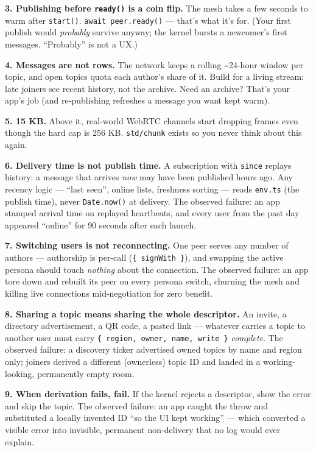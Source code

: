 \documentclass[
  nobib]{tufte-handout}
\begin{document}
\textbf{3. Publishing before \texttt{ready()} is a coin flip.} The mesh
takes a few seconds to warm after \texttt{start()}.
\texttt{await\ peer.ready()} --- that's what it's for. (Your first
publish would \emph{probably} survive anyway; the kernel bursts a
newcomer's first messages. ``Probably'' is not a UX.)

\textbf{4. Messages are not rows.} The network keeps a rolling
\textasciitilde24-hour window per topic, and open topics quota each
author's share of it. Build for a living stream: late joiners see recent
history, not the archive. Need an archive? That's your app's job (and
re-publishing refreshes a message you want kept warm).

\textbf{5. 15 KB.} Above it, real-world WebRTC channels start dropping
frames even though the hard cap is 256 KB. \texttt{std/chunk} exists so
you never think about this again.

\textbf{6. Delivery time is not publish time.} A subscription with
\texttt{since} replays history: a message that arrives \emph{now} may
have been published hours ago. Any recency logic --- ``last seen'',
online lists, freshness sorting --- reads \texttt{env.ts} (the publish
time), never \texttt{Date.now()} at delivery. The observed failure: an
app stamped arrival time on replayed heartbeats, and every user from the
past day appeared ``online'' for 90 seconds after each launch.

\textbf{7. Switching users is not reconnecting.} One peer serves any
number of authors --- authorship is per-call
(\texttt{\{\ signWith\ \}}), and swapping the active persona should
touch \emph{nothing} about the connection. The observed failure: an app
tore down and rebuilt its peer on every persona switch, churning the
mesh and killing live connections mid-negotiation for zero benefit.

\textbf{8. Sharing a topic means sharing the whole descriptor.} An
invite, a directory advertisement, a QR code, a pasted link --- whatever
carries a topic to another user must carry
\texttt{\{\ region,\ owner,\ name,\ write\ \}} \emph{complete}. The
observed failure: a discovery ticker advertised owned topics by name and
region only; joiners derived a different (ownerless) topic ID and landed
in a working-looking, permanently empty room.

\textbf{9. When derivation fails, fail.} If the kernel rejects a
descriptor, show the error and skip the topic. The observed failure: an
app caught the throw and substituted a locally invented ID ``so the UI
kept working'' --- which converted a visible error into invisible,
permanent non-delivery that no log would ever explain.
\end{document}
